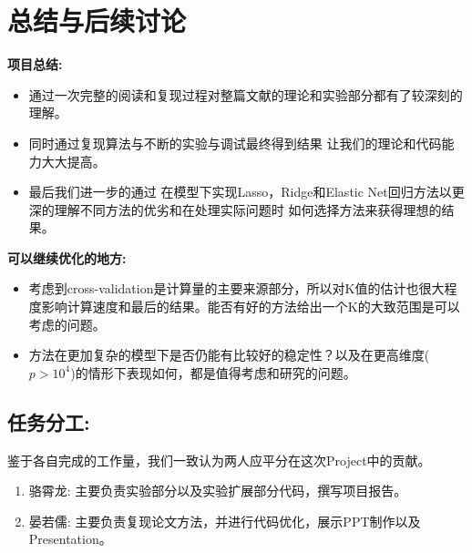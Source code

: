 \documentclass[lang=cn,11pt,a4paper]{elegantpaper}
\newcommand{\Blue}[1]{\textcolor[rgb]{0,0,0.803}{#1}}
\begin{document}
\newpage

\section{总结与后续讨论}
\large{\textbf{\Blue{项目总结:}}} 
\begin{itemize}
    \item 通过一次完整的阅读和复现过程对整篇文献的理论和实验部分都有了较深刻的理解。
    \item 同时通过复现算法与不断的实验与调试最终得到结果 让我们的理论和代码能力大大提高。 
    \item 最后我们进一步的通过 在模型下实现Lasso，Ridge和Elastic Net回归方法以更深的理解不同方法的优劣和在处理实际问题时 如何选择方法来获得理想的结果。
\end{itemize}


\large{\textbf{\Blue{可以继续优化的地方:}}}
\begin{itemize}
    \item 考虑到cross-validation是计算量的主要来源部分，所以对K值的估计也很大程度影响计算速度和最后的结果。能否有好的方法给出一个K的大致范围是可以考虑的问题。
    \item 方法在更加复杂的模型下是否仍能有比较好的稳定性？以及在更高维度($p>10^4$)的情形下表现如何，都是值得考虑和研究的问题。
\end{itemize}

\subsection{任务分工:} 
\Blue{鉴于各自完成的工作量，我们一致认为两人应平分在这次Project中的贡献。}
\begin{enumerate}
    \item 骆霄龙:  主要负责实验部分以及实验扩展部分代码，撰写项目报告。
    \item 晏若儒:  主要负责复现论文方法，并进行代码优化，展示PPT制作以及Presentation。
\end{enumerate}

\newpage
\nocite{*}

\end{document}
